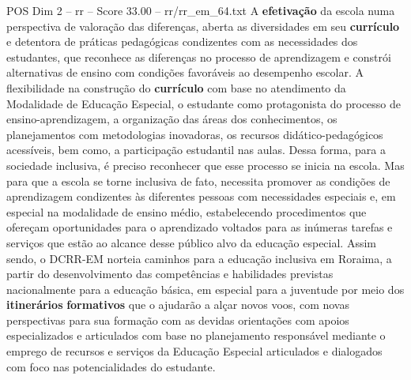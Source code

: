 \begin{textsample}{POS Dim 2 – rr – Score 33.00 – rr/rr\_em\_64.txt}
A \textbf{efetivação} da escola numa perspectiva de valoração das diferenças, aberta as diversidades em seu \textbf{currículo} e detentora de práticas pedagógicas condizentes com as necessidades dos estudantes, que reconhece as diferenças no processo de aprendizagem e constrói alternativas de ensino com condições favoráveis ao desempenho escolar.
A flexibilidade na construção do \textbf{currículo} com base no atendimento da Modalidade de Educação Especial, o estudante como protagonista do processo de ensino-aprendizagem, a organização das áreas dos conhecimentos, os planejamentos com metodologias inovadoras, os recursos didático-pedagógicos acessíveis, bem como, a participação estudantil nas aulas.
Dessa forma, para a sociedade inclusiva, é preciso reconhecer que esse processo se inicia na escola.
Mas para que a escola se torne inclusiva de fato, necessita promover as condições de aprendizagem condizentes às diferentes pessoas com necessidades especiais e, em especial na modalidade de ensino médio, estabelecendo procedimentos que ofereçam oportunidades para o aprendizado voltados para as inúmeras tarefas e serviços que estão ao alcance desse público alvo da educação especial.
Assim sendo, o DCRR-EM norteia caminhos para a educação inclusiva em Roraima, a partir do desenvolvimento das competências e habilidades previstas nacionalmente para a educação básica, em especial para a juventude por meio dos \textbf{itinerários} \textbf{formativos} que o ajudarão a alçar novos voos, com novas perspectivas para sua formação com as devidas orientações com apoios especializados e articulados com base no planejamento responsável mediante o emprego de recursos e serviços da Educação Especial articulados e dialogados com foco nas potencialidades do estudante.

\end{textsample}
